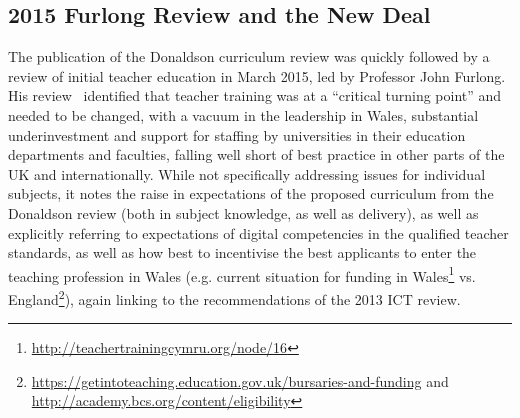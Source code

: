 \documentclass{sig-alternate}
\begin{document}


\subsection{2015 Furlong Review and the New Deal}



The publication of the Donaldson curriculum review was quickly
followed by a review of initial teacher education in March 2015, led
by Professor John Furlong. His review~\cite{Furlong:2015} identified
that teacher training was at a ``critical turning point'' and needed
to be changed, with a vacuum in the leadership in Wales, substantial
underinvestment and support for staffing by universities in their
education departments and faculties, falling well short of best
practice in other parts of the UK and internationally. While not
specifically addressing issues for individual subjects, it notes the
raise in expectations of the proposed curriculum from the Donaldson
review (both in subject knowledge, as well as delivery), as well as
explicitly referring to expectations of digital competencies in the
qualified teacher standards, as well as how best to incentivise the
best applicants to enter the teaching profession in Wales
(e.g. current situation for funding in
Wales\footnote{\url{http://teachertrainingcymru.org/node/16}}
vs. England\footnote{\url{https://getintoteaching.education.gov.uk/bursaries-and-funding}
and \url{http://academy.bcs.org/content/eligibility}}), again linking
to the recommendations of the 2013 ICT review.
\end{document}
